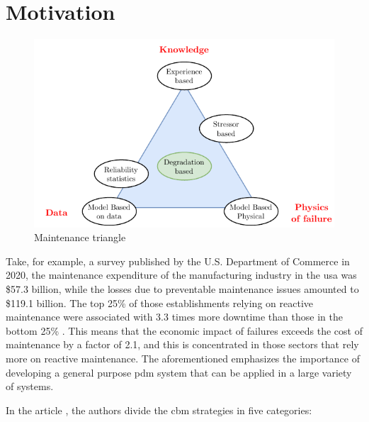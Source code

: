 \section{Motivation}
\label{sec:motivation}

\begin{figure}
    \centering
    \includegraphics[scale=1.3]{images/Intro/MaintTriangle.pdf}
    \caption{Maintenance triangle}
    \label{fig:MaintTriangle}
\end{figure} 

Take, for example, a survey published by the U.S. Department of Commerce in 2020, the maintenance expenditure of the manufacturing industry in the \gls{usa} was \$57.3 billion, while the losses due to preventable maintenance issues amounted to \$119.1 billion. The top 25\% of those establishments relying on reactive maintenance were associated with 3.3 times more downtime than those in the bottom 25\% \cite{NIST}. This means that the economic impact of failures exceeds the cost of maintenance by a factor of 2.1, and this is concentrated in those sectors that rely more on reactive maintenance. The aforementioned emphasizes the importance of developing a general purpose \gls{pdm} system that can be applied in a large variety of systems.

In the article \cite{Maintenance_cat}, the authors divide the \gls{cbm} strategies in five categories:

